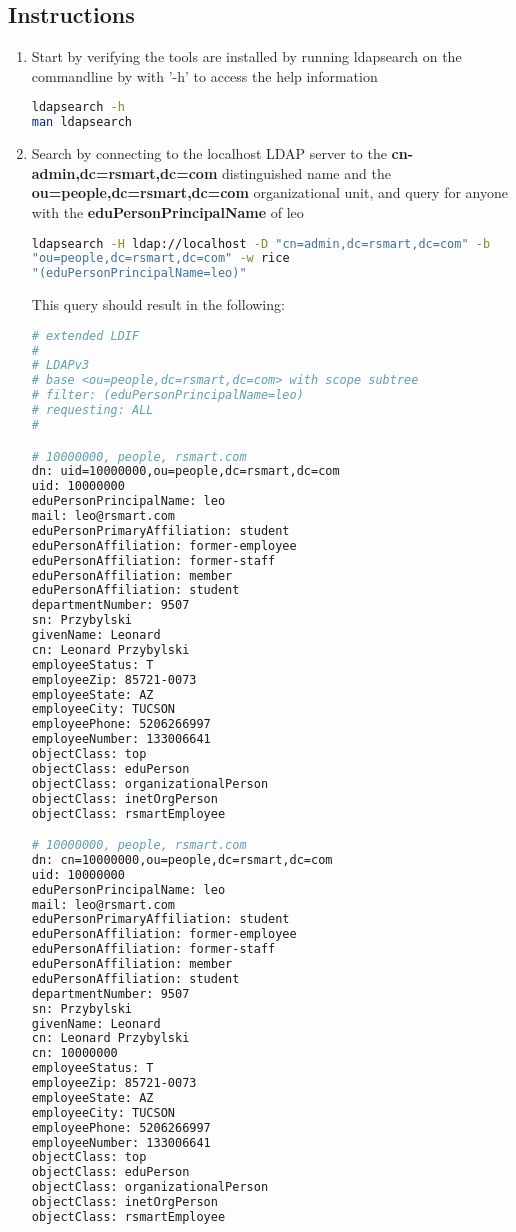 \subsection*{Instructions}
\begin{enumerate}
\item Start by verifying the tools are installed by running ldapsearch
  on the commandline by with '-h' to access the help information
\begin{lstlisting}[language=bash,basicstyle=\scriptsize,backgroundcolor=\color{ubergray},caption={Verify
  the ldapsearch is there},frame=single,breaklines=true]
ldapsearch -h
man ldapsearch
\end{lstlisting}
\item Search by connecting to the localhost LDAP server to the
  \textbf{cn-admin,dc=rsmart,dc=com} distinguished name and the
  \textbf{ou=people,dc=rsmart,dc=com} organizational unit, and query
  for anyone with the \textbf{eduPersonPrincipalName} of leo
\begin{lstlisting}[language=bash,basicstyle=\scriptsize,backgroundcolor=\color{ubergray},caption={Verify
  the ldapsearch is there},frame=single,breaklines=true]
ldapsearch -H ldap://localhost -D "cn=admin,dc=rsmart,dc=com" -b
"ou=people,dc=rsmart,dc=com" -w rice
"(eduPersonPrincipalName=leo)"\end{lstlisting}
This query should result in the following:
\begin{lstlisting}[language=bash,basicstyle=\scriptsize,backgroundcolor=\color{ubergray},caption={Basic
  query using eduPersonPrincipalName},frame=single,breaklines=true]
# extended LDIF
#
# LDAPv3
# base <ou=people,dc=rsmart,dc=com> with scope subtree
# filter: (eduPersonPrincipalName=leo)
# requesting: ALL
#

# 10000000, people, rsmart.com
dn: uid=10000000,ou=people,dc=rsmart,dc=com
uid: 10000000
eduPersonPrincipalName: leo
mail: leo@rsmart.com
eduPersonPrimaryAffiliation: student
eduPersonAffiliation: former-employee
eduPersonAffiliation: former-staff
eduPersonAffiliation: member
eduPersonAffiliation: student
departmentNumber: 9507
sn: Przybylski
givenName: Leonard
cn: Leonard Przybylski
employeeStatus: T
employeeZip: 85721-0073
employeeState: AZ
employeeCity: TUCSON
employeePhone: 5206266997
employeeNumber: 133006641
objectClass: top
objectClass: eduPerson
objectClass: organizationalPerson
objectClass: inetOrgPerson
objectClass: rsmartEmployee

# 10000000, people, rsmart.com
dn: cn=10000000,ou=people,dc=rsmart,dc=com
uid: 10000000
eduPersonPrincipalName: leo
mail: leo@rsmart.com
eduPersonPrimaryAffiliation: student
eduPersonAffiliation: former-employee
eduPersonAffiliation: former-staff
eduPersonAffiliation: member
eduPersonAffiliation: student
departmentNumber: 9507
sn: Przybylski
givenName: Leonard
cn: Leonard Przybylski
cn: 10000000
employeeStatus: T
employeeZip: 85721-0073
employeeState: AZ
employeeCity: TUCSON
employeePhone: 5206266997
employeeNumber: 133006641
objectClass: top
objectClass: eduPerson
objectClass: organizationalPerson
objectClass: inetOrgPerson
objectClass: rsmartEmployee


\end{lstlisting}
\end{enumerate}

